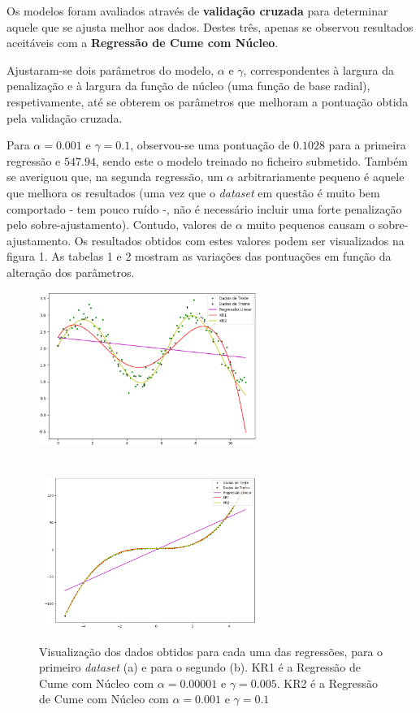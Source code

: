 \documentclass[twocolumn, 9pt]{extarticle}
\begin{document}
Os modelos foram avaliados através de \textbf{validação cruzada} para determinar aquele que se ajusta melhor aos dados. Destes três, apenas se observou resultados aceitáveis com a \textbf{Regressão de Cume com Núcleo}.\par

Ajustaram-se dois parâmetros do modelo, $\alpha$ e $\gamma$, correspondentes à largura da penalização e à largura da função de núcleo (uma função de base radial), respetivamente, até se obterem os parâmetros que melhoram a pontuação obtida pela validação cruzada.\par

Para $\alpha = 0.001$ e $\gamma = 0.1$, observou-se uma pontuação de $0.1028$ para a primeira regressão e $547.94$, sendo este o modelo treinado no ficheiro submetido. Também se averiguou que, na segunda regressão, um $\alpha$ arbitrariamente pequeno é aquele que melhora os resultados (uma vez que o \textit{dataset} em questão é muito bem comportado - tem pouco ruído -, não é necessário incluir uma forte penalização pelo sobre-ajustamento). Contudo, valores de $\alpha$ muito pequenos causam o sobre-ajustamento. Os resultados obtidos com estes valores podem ser visualizados na figura 1. As tabelas 1 e 2 mostram as variações das pontuações em função da alteração dos parâmetros.\par


\begin{figure}[ht]
	\centering
	\includegraphics[width=200pt]{Regressoes1.png}
	\par{}
	\\ \
	\includegraphics[width=200pt]{Regressoes2.png}
	\par{}
	\caption{\footnotesize Visualização dos dados obtidos para cada uma das regressões, para o primeiro \textit{dataset} (a) e para o segundo (b). KR1 é a Regressão de Cume com Núcleo com $\alpha = 0.00001$ e $\gamma = 0.005$. KR2 é a Regressão de Cume com Núcleo com $\alpha = 0.001$ e $\gamma = 0.1$}
\end{figure}
\end{document}
